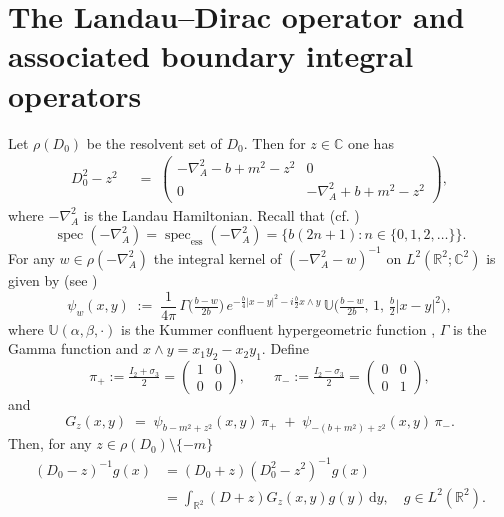 \documentclass[11pt,a4paper,reqno,oneside]{amsproc}
\DeclareMathOperator{\spec}{spec}
\newcommand{\spece}{\spec_\mathrm{ess}}
\newcommand{\ddd}{\,\mathrm{d}}
\def \rr {{\mathbb R}}
\def \cc {{\mathbb C}}
\numberwithin{equation}{section}
\def \cc {{\mathbb{C}}}
\begin{document}
 \section{The Landau--Dirac operator and associated boundary integral operators}\label{S2}
Let $\rho(D_0)$ be the resolvent set of $D_0$. Then for $z\in\mathbb C$ one has 
\begin{align*}%
D_0^2 - z^2 \;\;
&=\; \begin{pmatrix} -\nabla_A^2 - b + m^2 - z^2 & 0 \\ 0 & -\nabla_A^2 + b + m^2 - z^2\end{pmatrix},
\end{align*}
where $-\nabla_A^2$ is the Landau Hamiltonian. Recall that (cf. \cite{AvHeSi78})
\[
\spec ( -\nabla_A^2)=\spece ( -\nabla_A^2)= \{b(2n+1): n\in \{0,1,2,\dots\} \}.
\]
For any $w\in\rho(-\nabla_A^2)$ the integral kernel of $(-\nabla_A^2-w)^{-1}$  on $L^2(\rr^2;\cc^2)$ is given by (see \cite{DoMaMa75,HoSmi2002})
\begin{equation*}%
\psi_w(x,y) \;:=\; \frac{1}{4\pi}\,\Gamma\!\Big(\tfrac{b-w}{2b}\Big)\, e^{-\frac{b}{4}|x-y|^2 - i\frac{b}{2} x\wedge y}\, \mathbb{U}\!\Big(\tfrac{b-w}{2b},\,1,\,\tfrac{b}{2}|x-y|^2\Big),
\end{equation*}
where $\mathbb{U}(\alpha,\beta,\cdot)$ is the Kummer confluent hypergeometric function  \cite[Section (13.2)]{Olver}, $\Gamma$ is  the Gamma function  and $x\wedge y = x_1y_2 - x_2y_1$. 
Define 
\begin{equation}\label{pi}
\pi_+ :=\tfrac{I_2+\sigma_3}{2}=
\begin{pmatrix}
1 & 0 \\
0 & 0
\end{pmatrix},
\qquad
\pi_- :=\tfrac{I_2-\sigma_3}{2}=
\begin{pmatrix}
0 & 0 \\
0 & 1
\end{pmatrix},
\end{equation}
and 
\begin{equation*}%
G_z(x,y) \;=\; \psi_{b-m^2+z^2}(x,y)\,\pi_+ \;+\; \psi_{-(b+m^2)+z^2}(x,y)\,\pi_-.
\end{equation*}
Then, for any $z\in\rho(D_0)\setminus{\{- m}\}$
\begin{align*}
    (D_0 -z)^{-1}g(x)&=(D_0+z)(D_0^2-z^2)^{-1}g(x)\\
    &=\int_{\rr^2}(D+z)G_z(x,y)g(y)\ddd y, \quad g\in L^2(\rr^2).\\
\end{align*}
\end{document}
